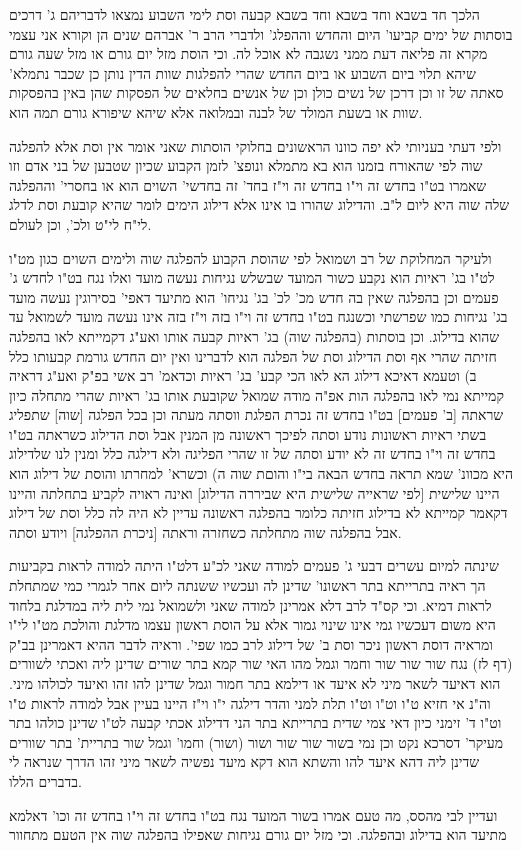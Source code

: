 \documentclass[12pt, openany]{book}
\begin{document}
{הלכך חד בשבא וחד בשבא וחד בשבא קבעה וסת לימי השבוע נמצאו לדבריהם ג' דרכים בוסתות של ימים קביעו' היום והחדש וההפלג' ולדברי הרב ר' אברהם שנים הן וקורא אני עצמי מקרא זה פליאה דעת ממני נשגבה לא אוכל לה. וכי הוסת מזל יום גורם או מזל שעה גורם שיהא תלוי ביום השבוע או ביום החדש שהרי להפלגות שוות הדין נותן כן שכבר נתמלא' סאתה של זו וכן דרכן של נשים כולן וכן של אנשים בחלאים של הפסקות שהן באין בהפסקות שוות או בשעת המולד של לבנה ובמלואה אלא שיהא שיפורא גורם תמה הוא.\par ולפי דעתי בעניותי לא יפה כוונו הראשונים בחלוקי הוסתות שאני אומר אין וסת אלא להפלגה שוה לפי שהאורח בזמנו הוא בא מתמלא ונופצ' לזמן הקבוע שכיון שטבען של בני אדם וזו שאמרו בט"ו בחדש זה וי"ו בחדש זה וי"ז בחד' זה בחדשי' השוים הוא או בחסרי' וההפלגה שלה שוה היא ליום ל"ב. והדילוג שהורו בו אינו אלא דילוג הימים לומר שהיא קובעת וסת לדלג לי"ח לי"ט ולכ', וכן לעולם.\par ולעיקר המחלוקת של רב ושמואל לפי שהוסת הקבוע להפלגה שוה ולימים השוים כגון מט"ו לט"ו בג' ראיות הוא נקבע כשור המועד שבשלש נגיחות נעשה מועד ואלו נגח בט"ו לחדש ג' פעמים וכן בהפלגה שאין בה חדש מכ' לכ' בג' נגיחו' הוא מתיעד דאפי' בסירוגין נעשה מועד בג' נגיחות כמו שפרשתי וכשנגח בט"ו בחדש זה וי"ו בזה וי"ז בזה אינו נעשה מועד לשמואל עד שהוא בדילוג. וכן בוסתות (בהפלגה שוה) בג' ראיות קבעה אותו ואע"ג דקמייתא לאו בהפלגה חזיתה שהרי אף וסת הדילוג וסת של הפלגה הוא לדברינו ואין יום החדש גורמת קבעותו כלל ב) וטעמא דאיכא דילוג הא לאו הכי קבע' בג' ראיות וכדאמ' רב אשי בפ"ק ואע"ג דראיה קמייתא נמי לאו בהפלגה הות אפ"ה מודה שמואל שקובעת אותו בג' ראיות שהרי מתחלה כיון שראתה [ב' פעמים] בט"ו בחדש זה נכרת הפלגת ווסתה מעתה וכן בכל הפלגה [שוה] שתפליג בשתי ראיות ראשונות נודע וסתה לפיכך ראשונה מן המנין אבל וסת הדילוג כשראתה בט"ו בחדש זה וי"ו בחדש זה לא יודע וסתה של זו שהרי הפליגה ולא דילגה כלל ומנין לנו שלדילוג היא מכוונ' שמא תראה בחדש הבאה בי"ו והוםת שוה ה) וכשרא' למחרתו והוסת של דילוג הוא היינו שלישית {\small [לפי שראייה שלישית היא שביררה הדילוג]} ואינה ראויה לקביע בתחלתה והיינו דקאמר קמייתא לא בדילוג חזיתה כלומר בהפלגה ראשונה עדיין לא היה לה כלל וסת של דילוג אבל בהפלגה שוה מתחלתה כשחזרה וראתה [ניכרת ההפלגה] ויודע וסתה.\par [והא דאמרינן] שינתה למיום עשרים דבעי ג' פעמים למודה שאני לכ"ע דלט"ו היתה למודה לראות בקביעות הך ראיה בתרייתא בתר ראשונו' שדינן לה ועכשיו ששנתה ליום אחר לגמרי כמי שמתחלת לראות דמיא. וכי קס"ד לרב דלא אמרינן למודה שאני ולשמואל נמי לית ליה במדלגת בלחוד היא משום דעכשיו גמי אינו שינוי גמור אלא על הוסת ראשון עצמו מדלגת והולכת מט"ו לי"ו ומראיה דוסת ראשון ניכר וסת ב' של דילוג לרב כמו שפי'. וראיה לדבר ההיא דאמרינן בב"ק (דף לז) נגח שור שור שור וחמר וגמל מהו האי שור קמא בתר שורים שדינן ליה ואכתי לשוורים הוא דאיעד לשאר מיני לא איעד או דילמא בתר חמור וגמל שדינן להו זהו ואיעד לכולהו מיני. וה"נ אי חזיא ט"ו וט"ו וט"ו תלת למני והדר דילגה י"ו וי"ז היינו בעיין אבל למודה לראות ט"ו וט"ו ד' זימני כיון דאי צמי שדית בתרייתא בתר הני דדילוג אכתי קבעה לט"ו שדינן כולהו בתר מעיקר' דסרכא נקט וכן נמי בשור שור שור ושור (ושור) וחמו' וגמל שור בתריית' בתר שוורים שדינן ליה דהא איעד להו והשתא הוא דקא מיעד נפשיה לשאר מיני זהו הדרך שנראה לי בדברים הללו.\par ועדיין לבי מהסס, מה טעם אמרו בשור המועד נגח בט"ו בחדש זה וי"ו בחדש זה וכו' דאלמא מתיעד הוא בדילוג ובהפלגה. וכי מזל יום גורם נגיחות שאפילו בהפלגה שוה אין הטעם מתחוור }
\end{document}
